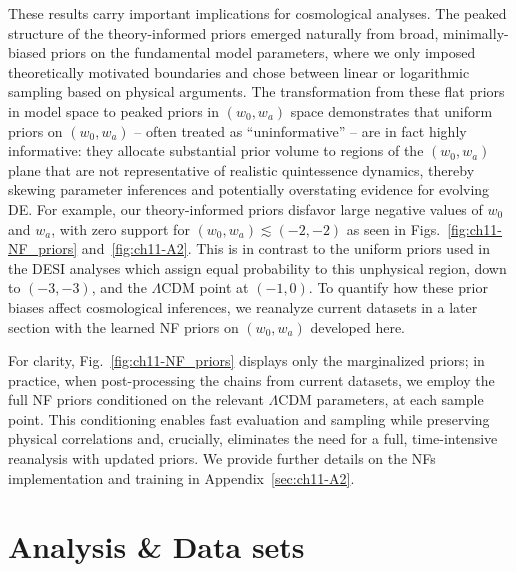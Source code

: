 These results carry important implications for cosmological analyses. The peaked structure of the theory-informed priors emerged naturally from broad, minimally-biased priors on the fundamental model parameters, where we only imposed theoretically motivated boundaries and chose between linear or logarithmic sampling based on physical arguments. The transformation from these flat priors in model space to peaked priors in $(w_0, w_a)$ space demonstrates that uniform priors on $(w_0, w_a)$ -- often treated as ``uninformative'' -- are in fact highly informative: they allocate substantial prior volume to regions of the $(w_0,w_a)$ plane that are not representative of realistic quintessence dynamics, thereby skewing parameter inferences and potentially overstating evidence for evolving DE. For example, our theory-informed priors disfavor large negative values of $w_0$ and $w_a$, with zero support for $(w_0,w_a)\lesssim (-2,-2)$ as seen in Figs.~\ref{fig:ch11-NF_priors} and~\ref{fig:ch11-A2}. This is in contrast to the uniform priors used in the DESI analyses which assign equal probability to this unphysical region, down to $(-3,-3)$, and the $\Lambda$CDM point at $(-1, 0)$. To quantify how these prior biases affect cosmological inferences, we reanalyze current datasets in a later section with the learned NF priors on $(w_0,w_a)$ developed here.

For clarity, Fig.~\ref{fig:ch11-NF_priors} displays only the marginalized
 priors;  in practice, when post-processing the chains from current datasets, we employ the full NF priors conditioned on the relevant $\Lambda$CDM parameters,
 at each sample point. This conditioning enables fast evaluation and sampling while preserving physical correlations and, crucially, eliminates the need for a full, time-intensive reanalysis with updated priors.
We provide further details on the NFs implementation and training in Appendix~\ref{sec:ch11-A2}.


\section{Analysis \& Data sets} \label{sec:ch11-AnalysisAndDatasets}


